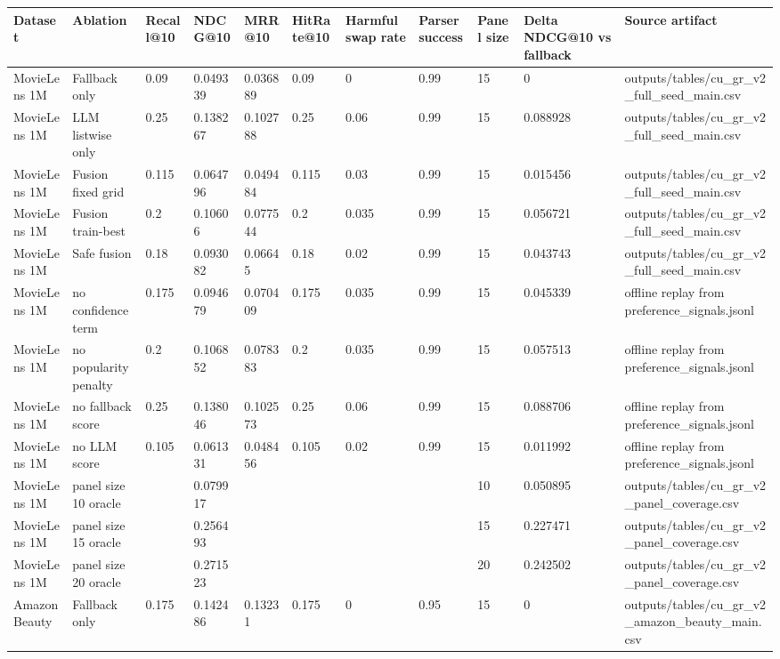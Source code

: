 \begin{tabular}{lllllllllll}
\toprule
Dataset & Ablation & Recall@10 & NDCG@10 & MRR@10 & HitRate@10 & Harmful swap rate & Parser success & Panel size & Delta NDCG@10 vs fallback & Source artifact \\
\midrule
MovieLens 1M & Fallback only & 0.09 & 0.049339 & 0.036889 & 0.09 & 0 & 0.99 & 15 & 0 & outputs/tables/cu\_gr\_v2\_full\_seed\_main.csv \\
MovieLens 1M & LLM listwise only & 0.25 & 0.138267 & 0.102788 & 0.25 & 0.06 & 0.99 & 15 & 0.088928 & outputs/tables/cu\_gr\_v2\_full\_seed\_main.csv \\
MovieLens 1M & Fusion fixed grid & 0.115 & 0.064796 & 0.049484 & 0.115 & 0.03 & 0.99 & 15 & 0.015456 & outputs/tables/cu\_gr\_v2\_full\_seed\_main.csv \\
MovieLens 1M & Fusion train-best & 0.2 & 0.10606 & 0.077544 & 0.2 & 0.035 & 0.99 & 15 & 0.056721 & outputs/tables/cu\_gr\_v2\_full\_seed\_main.csv \\
MovieLens 1M & Safe fusion & 0.18 & 0.093082 & 0.06645 & 0.18 & 0.02 & 0.99 & 15 & 0.043743 & outputs/tables/cu\_gr\_v2\_full\_seed\_main.csv \\
MovieLens 1M & no confidence term & 0.175 & 0.094679 & 0.070409 & 0.175 & 0.035 & 0.99 & 15 & 0.045339 & offline replay from preference\_signals.jsonl \\
MovieLens 1M & no popularity penalty & 0.2 & 0.106852 & 0.078383 & 0.2 & 0.035 & 0.99 & 15 & 0.057513 & offline replay from preference\_signals.jsonl \\
MovieLens 1M & no fallback score & 0.25 & 0.138046 & 0.102573 & 0.25 & 0.06 & 0.99 & 15 & 0.088706 & offline replay from preference\_signals.jsonl \\
MovieLens 1M & no LLM score & 0.105 & 0.061331 & 0.048456 & 0.105 & 0.02 & 0.99 & 15 & 0.011992 & offline replay from preference\_signals.jsonl \\
MovieLens 1M & panel size 10 oracle &  & 0.079917 &  &  &  &  & 10 & 0.050895 & outputs/tables/cu\_gr\_v2\_panel\_coverage.csv \\
MovieLens 1M & panel size 15 oracle &  & 0.256493 &  &  &  &  & 15 & 0.227471 & outputs/tables/cu\_gr\_v2\_panel\_coverage.csv \\
MovieLens 1M & panel size 20 oracle &  & 0.271523 &  &  &  &  & 20 & 0.242502 & outputs/tables/cu\_gr\_v2\_panel\_coverage.csv \\
Amazon Beauty & Fallback only & 0.175 & 0.142486 & 0.13231 & 0.175 & 0 & 0.95 & 15 & 0 & outputs/tables/cu\_gr\_v2\_amazon\_beauty\_main.csv \\

\end{tabular}
